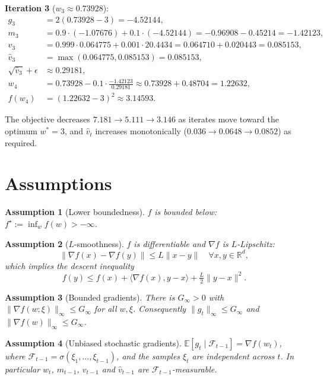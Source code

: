 \documentclass[11pt]{article}
\newtheorem{assumption}{Assumption}
\begin{document}
\textbf{Iteration 3} ($w_3 \approx 0.73928$):
\begin{align*}
g_3 &= 2(0.73928-3) = -4.52144,\\
m_3 &= 0.9\cdot(-1.07676) + 0.1\cdot(-4.52144) = -0.96908 - 0.45214 = -1.42123,\\
v_3 &= 0.999\cdot 0.064775 + 0.001\cdot 20.4434 = 0.064710 + 0.020443 = 0.085153,\\
\hat v_3 &= \max(0.064775, 0.085153) = 0.085153,\\
\sqrt{\hat v_3}+\epsilon &\approx 0.29181,\\
w_4 &= 0.73928 - 0.1\cdot\frac{-1.42123}{0.29181} \approx 0.73928 + 0.48704 = 1.22632,\\
f(w_4) &= (1.22632-3)^2 \approx 3.14593.
\end{align*}

The objective decreases $7.181 \to 5.111 \to 3.146$ as iterates move toward
the optimum $w^*=3$, and $\hat v_t$ increases monotonically
($0.036 \to 0.0648 \to 0.0852$) as required.

\section*{Assumptions}

\begin{assumption}[Lower boundedness]\label{a:lb}
$f$ is bounded below: $f^\star := \inf_w f(w) > -\infty$.
\end{assumption}

\begin{assumption}[$L$-smoothness]\label{a:smooth}
$f$ is differentiable and $\nabla f$ is $L$-Lipschitz:
\[
\|\nabla f(x)-\nabla f(y)\| \le L\|x-y\| \quad \forall x,y\in\mathbb{R}^d,
\]
which implies the descent inequality
\[
f(y) \le f(x) + \langle \nabla f(x), y-x\rangle + \tfrac{L}{2}\|y-x\|^2 .
\]
\end{assumption}

\begin{assumption}[Bounded gradients]\label{a:bg}
There is $G_\infty>0$ with $\|\nabla f(w;\xi)\|_\infty \le G_\infty$ for all
$w,\xi$. Consequently $\|g_t\|_\infty\le G_\infty$ and
$\|\nabla f(w)\|_\infty \le G_\infty$.
\end{assumption}

\begin{assumption}[Unbiased stochastic gradients]\label{a:unbias}
$\mathbb{E}[g_t \mid \mathcal{F}_{t-1}] = \nabla f(w_t)$, where
$\mathcal{F}_{t-1}=\sigma(\xi_1,\dots,\xi_{t-1})$, and the samples $\xi_t$ are
independent across $t$. In particular $w_t$, $m_{t-1}$, $v_{t-1}$ and
$\hat v_{t-1}$ are $\mathcal{F}_{t-1}$-measurable.
\end{assumption}
\end{document}
